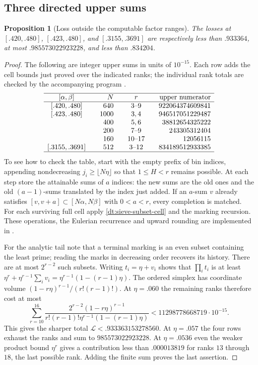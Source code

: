\documentclass[11pt,a4paper]{article}
\theoremstyle{paperplain}
\newtheorem{proposition}[theorem]{Proposition}
\numberwithin{equation}{section}
\begin{document}
\subsection{Three directed upper sums}
\begin{proposition}[Loss outside the computable factor ranges]\label{nine:certificate}
The losses at $[.420,.480]$, $[.423,.480]$, and $[.3155,.3691]$
are respectively less than $.933364$, at most $.985573022923228$,
and less than $.834204$.
\end{proposition}
\begin{proof}
The following are integer upper sums in units of $10^{-15}$.
Each row adds the cell bounds just proved over the indicated ranks;
the individual rank totals are checked by the accompanying program
.
\[
\begin{array}{c@{\qquad}r@{\qquad}c@{\qquad}r}
\hline
[\alpha,\beta]&N&r&\text{upper numerator}\\ \hline
{[.420,.480]}&640&3\text{--}9&922064374609841\\
{[.423,.480]}&1000&3,4&946517051229487\\
 &400&5,6&38812654325222\\
 &200&7\text{--}9&243305312404\\
 &160&10\text{--}17&12056115\\
{[.3155,.3691]}&512&3\text{--}12&834189512933385\\ \hline
\end{array}
\]
To see how to check the table, start with the empty prefix of bin
indices, appending nondecreasing $j_i\ge\lfloor N\eta\rfloor$
so that $1\le H<r$ remains possible. At each step store the
attainable sums of $a$ indices: the new sums are the old ones and
the old $(a-1)$-sums translated by the index just added. If an
$a$-sum $v$ already satisfies $[v,v+a]\subset[N\alpha,N\beta]$
with $0<a<r$, every completion is matched. For each surviving full
cell apply \eqref{dt:sieve-subset-cell} and the marking recursion.
These operations, the Eulerian recurrence and upward rounding are
implemented in .

For the analytic tail note that a terminal marking is an even subset
containing the least prime; reading the marks in decreasing order
recovers its history. There are at most $2^{r-2}$ such subsets.
Writing $t_i=\eta+v_i$ shows that $\prod_i t_i$ is at least
$\eta^r+\eta^{r-1}\sum_i v_i=\eta^{r-1}(1-(r-1)\eta)$.
The ordered simplex has coordinate volume
$(1-r\eta)^{r-1}/(r!(r-1)!)$. At $\eta=.060$ the remaining
ranks therefore cost at most
\begin{equation}\label{dt:sieve-tail}
 \sum_{r=10}^{16}
 \frac{2^{r-2}(1-r\eta)^{r-1}}{r!(r-1)!\eta^{r-1}(1-(r-1)\eta)}
 <11298778668719\cdot10^{-15}.
\end{equation}
This gives the sharper total $\mathscr L<.933363153278560$.
At $\eta=.057$ the four rows exhaust the ranks and sum to
$985573022923228$. At $\eta=.0536$ even the weaker product bound
$\eta^r$ gives a contribution less than $.000013819$ for ranks
$13$ through $18$, the last possible rank. Adding the finite sum
proves the last assertion.
\end{proof}
\end{document}
